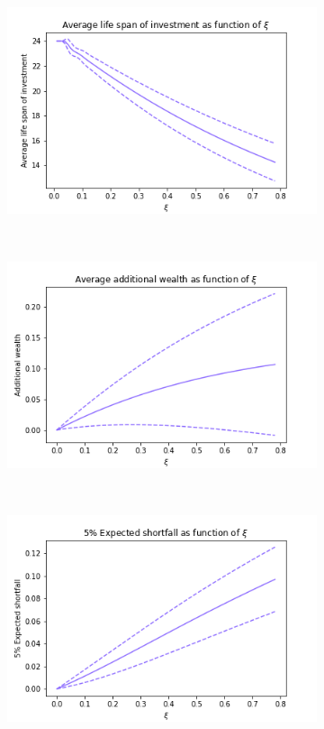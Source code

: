 \documentclass{article}
\begin{document}
\begin{figure}[b!]
     \centering
     \hfill
     \begin{subfigure}[b]{\textwidth}
         \centering
         \includegraphics[scale=.7]{png/average_life_span_W0=1_r=0.005_m=0.02592451988463669_sigma=0.06164058158266796_K=24_S=100000.png}
         \caption{}
         \label{fig:average-final-wealth-zero-life-span}
     \end{subfigure}
     \\
     \begin{subfigure}[b]{\textwidth}
         \centering
         \includegraphics[scale=.7]{png/additional_wealth_W0=1_r=0.005_m=0.02592451988463669_sigma=0.06164058158266796_K=24_S=100000.png}
         \caption{}
         \label{fig:average-final-wealth-zero-additional wealth}
     \end{subfigure}
     \\
     \begin{subfigure}[b]{\textwidth}
         \centering
         \includegraphics[scale=.7]{png/expected_shortfall_W0=1_r=0.005_m=0.02592451988463669_sigma=0.06164058158266796_K=24_S=100000.png}

\end{subfigure}
\end{figure}
\end{document}
